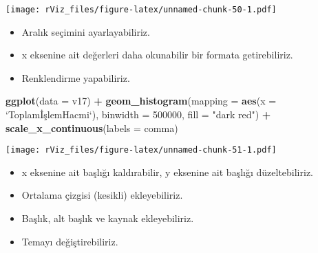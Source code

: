 \documentclass[
]{book}
\newenvironment{Shaded}{\begin{snugshade}}{\end{snugshade}}
\newcommand{\DataTypeTok}[1]{\textcolor[rgb]{0.13,0.29,0.53}{#1}}
\newcommand{\DecValTok}[1]{\textcolor[rgb]{0.00,0.00,0.81}{#1}}
\newcommand{\KeywordTok}[1]{\textcolor[rgb]{0.13,0.29,0.53}{\textbf{#1}}}
\newcommand{\NormalTok}[1]{#1}
\newcommand{\OperatorTok}[1]{\textcolor[rgb]{0.81,0.36,0.00}{\textbf{#1}}}
\newcommand{\StringTok}[1]{\textcolor[rgb]{0.31,0.60,0.02}{#1}}
\begin{document}
\texttt{[image: rViz\_files/figure-latex/unnamed-chunk-50-1.pdf]}

\begin{itemize}
\item
  Aralık seçimini ayarlayabiliriz.
\item
  x eksenine ait değerleri daha okunabilir bir formata getirebiliriz.
\item
  Renklendirme yapabiliriz.
\end{itemize}

\begin{Shaded}
\begin{Highlighting}[]
\KeywordTok{ggplot}\NormalTok{(}\DataTypeTok{data =}\NormalTok{ v17) }\OperatorTok{+}
\StringTok{  }\KeywordTok{geom_histogram}\NormalTok{(}\DataTypeTok{mapping =} \KeywordTok{aes}\NormalTok{(}\DataTypeTok{x =} \StringTok{`}\DataTypeTok{ToplamİşlemHacmi}\StringTok{`}\NormalTok{), }\DataTypeTok{binwidth =} \DecValTok{500000}\NormalTok{, }\DataTypeTok{fill =} \StringTok{"dark red"}\NormalTok{) }\OperatorTok{+}
\StringTok{  }\KeywordTok{scale_x_continuous}\NormalTok{(}\DataTypeTok{labels =}\NormalTok{ comma)}
\end{Highlighting}
\end{Shaded}

\texttt{[image: rViz\_files/figure-latex/unnamed-chunk-51-1.pdf]}

\begin{itemize}
\item
  x eksenine ait başlığı kaldırabilir, y eksenine ait başlığı düzeltebiliriz.
\item
  Ortalama çizgisi (kesikli) ekleyebiliriz.
\item
  Başlık, alt başlık ve kaynak ekleyebiliriz.
\item
  Temayı değiştirebiliriz.
\end{itemize}
\end{document}
